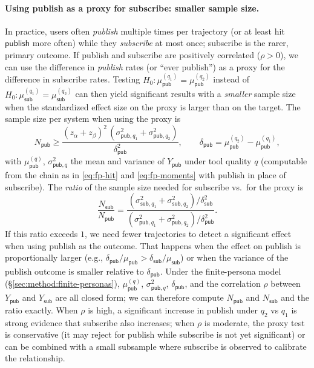 \paragraph{Using publish as a proxy for subscribe: smaller sample size.}
In practice, users often \emph{publish} multiple times per trajectory (or at least hit $\mathsf{publish}$ more often) while they \emph{subscribe} at most once; subscribe is the rarer, primary outcome. If publish and subscribe are positively correlated ($\rho > 0$), we can use the difference in \emph{publish} rates (or ``ever publish'') as a proxy for the difference in subscribe rates. Testing $H_0: \mu_{\mathsf{pub}}^{(q_1)} = \mu_{\mathsf{pub}}^{(q_2)}$ instead of $H_0: \mu_{\mathsf{sub}}^{(q_1)} = \mu_{\mathsf{sub}}^{(q_2)}$ can then yield significant results with a \emph{smaller} sample size when the standardized effect size on the proxy is larger than on the target. The sample size per system when using the proxy is
\begin{equation}
  N_{\mathsf{pub}} \geq \frac{(z_{\alpha} + z_{\beta})^2\, (\sigma_{\mathsf{pub},q_1}^2 + \sigma_{\mathsf{pub},q_2}^2)}{\delta_{\mathsf{pub}}^2}, \qquad \delta_{\mathsf{pub}} = \mu_{\mathsf{pub}}^{(q_2)} - \mu_{\mathsf{pub}}^{(q_1)},
\end{equation}
with $\mu_{\mathsf{pub}}^{(q)}$, $\sigma_{\mathsf{pub},q}^2$ the mean and variance of $Y_{\mathsf{pub}}$ under tool quality $q$ (computable from the chain as in \eqref{eq:fp-hit} and \eqref{eq:fp-moments} with publish in place of subscribe). The \emph{ratio} of the sample size needed for subscribe vs.\ for the proxy is
\begin{equation}
  \frac{N_{\mathsf{sub}}}{N_{\mathsf{pub}}} = \frac{(\sigma_{\mathsf{sub},q_1}^2 + \sigma_{\mathsf{sub},q_2}^2)/\delta_{\mathsf{sub}}^2}{(\sigma_{\mathsf{pub},q_1}^2 + \sigma_{\mathsf{pub},q_2}^2)/\delta_{\mathsf{pub}}^2}.
\end{equation}
If this ratio exceeds $1$, we need fewer trajectories to detect a significant effect when using publish as the outcome. That happens when the effect on publish is proportionally larger (e.g., $\delta_{\mathsf{pub}}/\mu_{\mathsf{pub}} > \delta_{\mathsf{sub}}/\mu_{\mathsf{sub}}$) or when the variance of the publish outcome is smaller relative to $\delta_{\mathsf{pub}}$. Under the finite-persona model (\S\ref{sec:method:finite-personas}), $\mu_{\mathsf{pub}}^{(q)}$, $\sigma_{\mathsf{pub},q}^2$, $\delta_{\mathsf{pub}}$, and the correlation $\rho$ between $Y_{\mathsf{pub}}$ and $Y_{\mathsf{sub}}$ are all closed form; we can therefore compute $N_{\mathsf{pub}}$ and $N_{\mathsf{sub}}$ and the ratio exactly. When $\rho$ is high, a significant increase in publish under $q_2$ vs $q_1$ is strong evidence that subscribe also increases; when $\rho$ is moderate, the proxy test is conservative (it may reject for publish while subscribe is not yet significant) or can be combined with a small subsample where subscribe is observed to calibrate the relationship.

